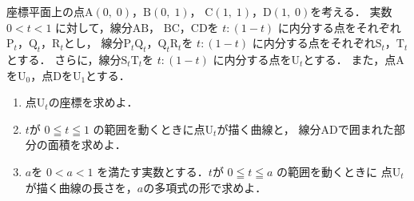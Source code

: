 ﻿\documentclass[../../../uem_tok_q.tex]{subfiles}
\begin{document}
    座標平面上の点$\mathrm{A}(0,\;0)$，$\mathrm{B}(0,\;1)$，%
    $\mathrm{C}(1,\;1)$，$\mathrm{D}(1,\;0)$を考える．%
    実数 $0<t<1$ に対して，線分$\mathrm{A}\mathrm{B}$，%
    $\mathrm{B}\mathrm{C}$，$\mathrm{C}\mathrm{D}$を $t:(1-t)$ に内分する点をそれぞれ%
    $\mathrm{P}_t$，$\mathrm{Q}_t$，$\mathrm{R}_t$とし，%
    線分$\mathrm{P}_t\mathrm{Q}_t$，$\mathrm{Q}_t\mathrm{R}_t$を %
    $t:(1-t)$ に内分する点をそれぞれ$\mathrm{S}_t$，$\mathrm{T}_t$とする．%
    さらに，線分$\mathrm{S}_t\mathrm{T}_t$を $t:(1-t)$ に内分する点を$\mathrm{U}_t$とする．%
    また，点Aを$\mathrm{U}_0$，点Dを$\mathrm{U}_1$とする．

    \begin{enumerate}
        \item 点$\mathrm{U}_t$の座標を求めよ．
        \item $t$が $0\leqq t\leqq1$ の範囲を動くときに点$\mathrm{U}_t$が描く曲線と，%
            線分ADで囲まれた部分の面積を求めよ．
        \item $a$を $0<a<1$ を満たす実数とする．$t$が $0\leqq t\leqq a$ の範囲を動くときに%
            点$\mathrm{U}_t$が描く曲線の長さを，$a$の多項式の形で求めよ．
    \end{enumerate}
\end{document}
